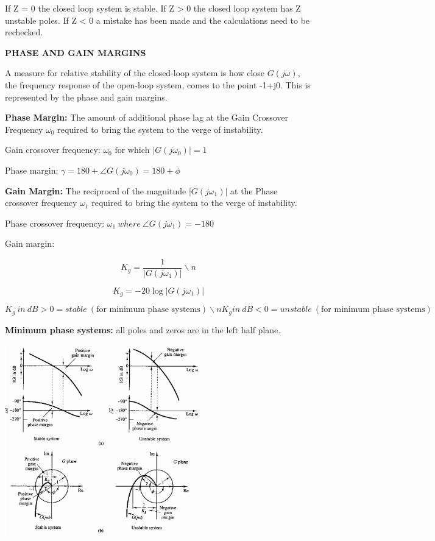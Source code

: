 \documentclass[a0,landscape]{article}
\begin{document}
\begin{multicols}{3}
If Z = 0 the closed loop system is stable. If Z \textgreater{} 0 the
closed loop system has Z unstable poles. If Z \textless{} 0 a mistake
has been made and the calculations need to be rechecked.

\textbf{PHASE AND GAIN MARGINS}

A measure for relative stability of the closed-loop system is how close
\(G(j\omega)\), the frequency response of the open-loop system, comes to
the point -1+j0. This is represented by the phase and gain margins.

\textbf{Phase Margin:} The amount of additional phase lag at the Gain
Crossover Frequency \(\omega_{0}\) required to bring the system to the
verge of instability.

Gain crossover frequency:
\(\omega_{0}\text{\ for\ which\ }\left| G\left( j\omega_{0} \right) \right| = 1\)

Phase margin:
\(\gamma = 180 + \angle G\left( j\omega_{0} \right) = 180 + \phi\)

\textbf{Gain Margin:} The reciprocal of the magnitude
\(\left| G(j\omega_{1}) \right|\) at the Phase crossover frequency
\(\omega_{1}\) required to bring the system to the verge of instability.

Phase crossover frequency:
\(\omega_{1}\ where\ \angle G\left( j\omega_{1} \right) = - 180\)

Gain margin:

\[K_{g} = \frac{1}{\left| G(j\omega_{1}) \right|}\backslash n\]

\[K_{g} = - 20\log\left| G\left( j\omega_{1} \right) \right|\]

\[{K_{g}\ in\ dB > 0 = stable\ \left( \text{for\ minimum\ phase\ systems} \right)\backslash n}{K_{g}in\ dB < 0 = unstable\ \left( \text{for\ minimum\ phase\ systems} \right)}\]

\textbf{Minimum phase systems:} all poles and zeros are in the left half
plane.

\includegraphics[width=3.35139in,height=3.27551in]{media/image26.png}


\end{multicols}
\end{document}
